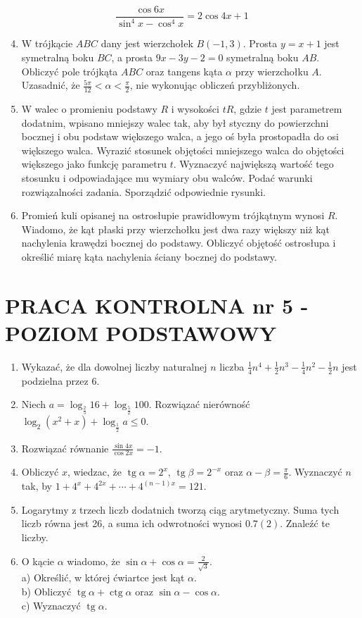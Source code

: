 \documentclass[10pt]{article}
\begin{document}
$$
\frac{\cos 6 x}{\sin ^{4} x-\cos ^{4} x}=2 \cos 4 x+1
$$

\begin{enumerate}
  \setcounter{enumi}{3}
  \item W trójkącie $A B C$ dany jest wierzchołek $B(-1,3)$. Prosta $y=x+1$ jest symetralną boku $B C$, a prosta $9 x-3 y-2=0$ symetralną boku $A B$. Obliczyć pole trójkąta $A B C$ oraz tangens kąta $\alpha$ przy wierzchołku $A$. Uzasadnić, że $\frac{5 \pi}{12}<\alpha<\frac{\pi}{2}$, nie wykonując obliczeń przybliżonych.
  \item W walec o promieniu podstawy $R$ i wysokości $t R$, gdzie $t$ jest parametrem dodatnim, wpisano mniejszy walec tak, aby był styczny do powierzchni bocznej i obu podstaw większego walca, a jego oś była prostopadła do osi większego walca. Wyrazić stosunek objętości mniejszego walca do objętości większego jako funkcję parametru $t$. Wyznaczyć największą wartość tego stosunku i odpowiadające mu wymiary obu walców. Podać warunki rozwiązalności zadania. Sporządzić odpowiednie rysunki.
  \item Promień kuli opisanej na ostrosłupie prawidłowym trójkątnym wynosi $R$. Wiadomo, że kąt płaski przy wierzchołku jest dwa razy większy niż kąt nachylenia krawędzi bocznej do podstawy. Obliczyć objętość ostrosłupa i określić miarę kąta nachylenia ściany bocznej do podstawy.
\end{enumerate}

\section*{PRACA KONTROLNA nr 5 - POZIOM PODSTAWOWY}
\begin{enumerate}
  \item Wykazać, że dla dowolnej liczby naturalnej $n$ liczba $\frac{1}{4} n^{4}+\frac{1}{2} n^{3}-\frac{1}{4} n^{2}-\frac{1}{2} n$ jest podzielna przez 6.
  \item Niech $a=\log _{\frac{2}{5}} 16+\log _{\frac{5}{2}} 100$. Rozwiązać nierówność $\log _{2}\left(x^{2}+x\right)+\log _{\frac{1}{2}} a \leqslant 0$.
  \item Rozwiązać równanie $\frac{\sin 4 x}{\cos 2 x}=-1$.
  \item Obliczyć $x$, wiedzac, że $\operatorname{tg} \alpha=2^{x}$, $\operatorname{tg} \beta=2^{-x}$ oraz $\alpha-\beta=\frac{\pi}{6}$. Wyznaczyć $n$ tak, by $1+4^{x}+4^{2 x}+\cdots+4^{(n-1) x}=121$.
  \item Logarytmy z trzech liczb dodatnich tworzą ciąg arytmetyczny. Suma tych liczb równa jest 26, a suma ich odwrotności wynosi $0.7(2)$. Znaleźć te liczby.
  \item O kącie $\alpha$ wiadomo, że $\sin \alpha+\cos \alpha=\frac{2}{\sqrt{3}}$.\\
a) Określić, w której ćwiartce jest kąt $\alpha$.\\
b) Obliczyć $\operatorname{tg} \alpha+\operatorname{ctg} \alpha$ oraz $\sin \alpha-\cos \alpha$.\\
c) Wyznaczyć $\operatorname{tg} \alpha$.
\end{enumerate}
\end{document}
